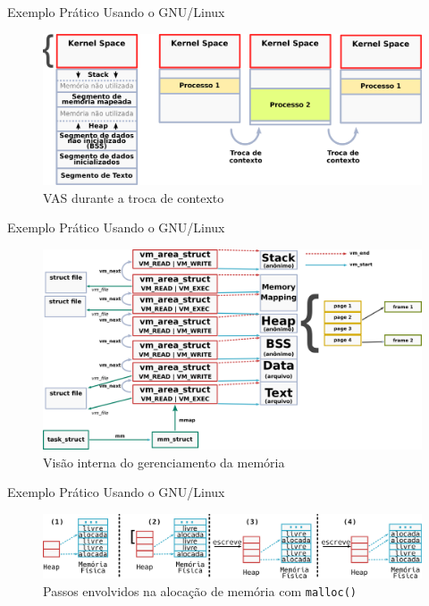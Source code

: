 \documentclass[xcolor={usenames,svgnames,dvipsnames},brazil,english,12pt,aspectratio=149]{beamer}
\begin{document}
\begin{frame}{Exemplo Prático Usando o GNU/Linux}
	\begin{figure}[!h]
		\centering
		\includegraphics[width=\textwidth]{segmento_troca_contexto}
		\caption{VAS durante a troca de contexto}
		\label{fig:vas_contexto}
	\end{figure}
\end{frame}

\begin{frame}{Exemplo Prático Usando o GNU/Linux}
	\begin{figure}[!h]
		\centering
		\includegraphics[width=.9\textwidth]{kernel_manages_memory}
		\caption{Visão interna do gerenciamento da memória}
		\label{fig:kernel_manages_memory}
	\end{figure}
\end{frame}

\begin{frame}{Exemplo Prático Usando o GNU/Linux}
	\begin{figure}[!h]
		\centering
		\includegraphics[width=\textwidth]{malloc}
		\caption{Passos envolvidos na alocação de memória com \texttt{malloc()}}
		\label{fig:malloc_linux}
	\end{figure}
\end{frame}
\end{document}
